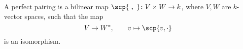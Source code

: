A perfect pairing is a bilinear map $\scp{\ ,\ }\colon V\times W\to k$, where
$V, W$ are $k$-vector spaces, such that the map
\[ V\to W^*,\qquad v\mapsto \scp{v, \cdot} \]
is an isomorphism.
